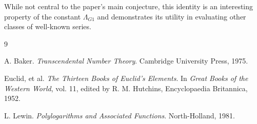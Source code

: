 \documentclass{amsart}
\theoremstyle{plain}
\theoremstyle{definition}
\theoremstyle{remark}
\newcommand{\LambdaG}{\Lambda_{G1}}
\begin{document}
While not central to the paper's main conjecture, this identity is an interesting property of the constant $\LambdaG$ and demonstrates its utility in evaluating other classes of well-known series.

\begin{thebibliography}{9}

A. Baker. \textit{Transcendental Number Theory}. Cambridge University Press, 1975.

Euclid, et al. \textit{The Thirteen Books of Euclid's Elements}. In \textit{Great Books of the Western World}, vol. 11, edited by R. M. Hutchins, Encyclopaedia Britannica, 1952.

L. Lewin. \textit{Polylogarithms and Associated Functions}. North-Holland, 1981.

\end{thebibliography}
\end{document}
